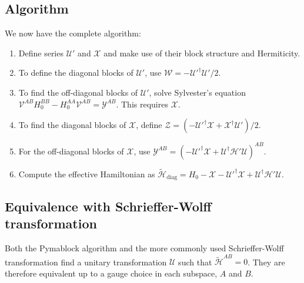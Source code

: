 \subsection{Algorithm}

We now have the complete algorithm:
%
\begin{enumerate}
    \item Define series $\mathcal{U}'$ and $\mathcal{X}$ and make use of their block structure and Hermiticity.
    \item To define the diagonal blocks of $\mathcal{U}'$, use $\mathcal{W} = -\mathcal{U}'^\dagger\mathcal{U}'/2$.
    \item To find the off-diagonal blocks of $\mathcal{U}'$, solve Sylvester's equation $\mathcal{V}^{AB}H_0^{BB} - H_0^{AA}\mathcal{V}^{AB} = \mathcal{Y}^{AB}$.
      This requires $\mathcal{X}$.
    \item To find the diagonal blocks of $\mathcal{X}$, define $\mathcal{Z} = (-\mathcal{U}'^\dagger\mathcal{X} + \mathcal{X}^\dagger\mathcal{U}')/2$.
    \item For the off-diagonal blocks of $\mathcal{X}$, use $\mathcal{Y}^{AB} =
    (-\mathcal{U}'^\dagger\mathcal{X} +
     \mathcal{U}^\dagger\mathcal{H}'\mathcal{U})^{AB}$.
    \item  Compute the effective Hamiltonian as $\tilde{\mathcal{H}}_{\textrm{diag}} = H_0 - \mathcal{X} - \mathcal{U}'^\dagger \mathcal{X} + \mathcal{U}^\dagger\mathcal{H'}\mathcal{U}$.
\end{enumerate}

\subsection{Equivalence with Schrieffer-Wolff transformation}
Both the Pymablock algorithm and the more commonly used Schrieffer-Wolff
transformation find a unitary transformation $\mathcal{U}$ such that
$\tilde{\mathcal{H}}^{AB}=0$.
They are therefore equivalent up to a gauge choice in each subspace, $A$ and
$B$.

